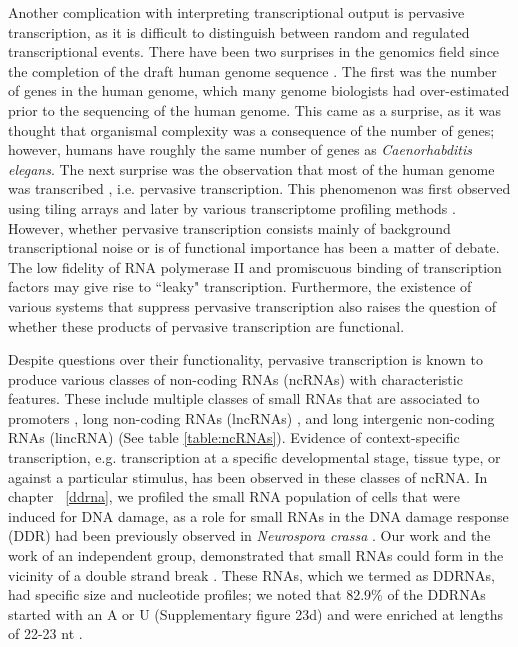 Another complication with interpreting transcriptional output is pervasive transcription, as it is difficult to distinguish between random and regulated transcriptional events. There have been two surprises in the genomics field since the completion of the draft human genome sequence \citep{lander2001initial,venter2001sequence}. The first was the number of genes in the human genome, which many genome biologists had over-estimated prior to the sequencing of the human genome. This came as a surprise, as it was thought that organismal complexity was a consequence of the number of genes; however, humans have roughly the same number of genes as \textit{Caenorhabditis elegans}. The next surprise was the observation that most of the human genome was transcribed \citep{pmid11988577, pmid17571346}, i.e. pervasive transcription. This phenomenon was first observed using tiling arrays \citep{pmid17510325} and later by various transcriptome profiling methods \citep{pmid22955620}. However, whether pervasive transcription consists mainly of background transcriptional noise or is of functional importance has been a matter of debate. The low fidelity of RNA polymerase II \citep{pmid17277804} and promiscuous binding of transcription factors \citep{pmid22868264} may give rise to ``leaky" transcription. Furthermore, the existence of various systems that suppress pervasive transcription \citep{pmid24267449} also raises the question of whether these products of pervasive transcription are functional.

Despite questions over their functionality, pervasive transcription is known to produce various classes of non-coding RNAs (ncRNAs) with characteristic features. These include multiple classes of small RNAs that are associated to promoters \citep{pmid19920851}, long non-coding RNAs (lncRNAs) \citep{pmid24290031}, and long intergenic non-coding RNAs (lincRNA) \citep{pmid23818866} (See table \ref{table:ncRNAs}). Evidence of context-specific transcription, e.g. transcription at a specific developmental stage, tissue type, or against a particular stimulus, has been observed in these classes of ncRNA. In chapter ~\ref{ddrna}, we profiled the small RNA population of cells that were induced for DNA damage, as a role for small RNAs in the DNA damage response (DDR) had been previously observed in \textit{Neurospora crassa} \citep{pmid19444217}. Our work and the work of an independent group, demonstrated that small RNAs could form in the vicinity of a double strand break \citep{francia2012site, pmid22445173}. These RNAs, which we termed as DDRNAs, had specific size and nucleotide profiles; we noted that 82.9\% of the DDRNAs started with an A or U (Supplementary figure 23d) and were enriched at lengths of 22-23 nt \citep{francia2012site}.

